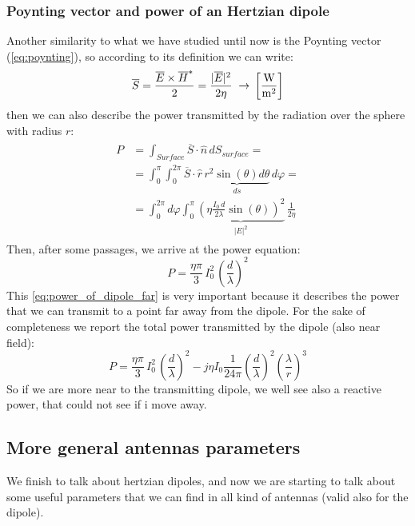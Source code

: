 \subsubsection*{Poynting vector and power of an Hertzian dipole}
Another similarity to what we have studied until now is the Poynting vector (\cref{eq:poynting}), so according to its definition we can write:
\begin{equation}
        \overline{S}=\frac{\overline{E}\times\overline{H}^*}{2}=\frac{|\overline{E}|^2}{2\eta}\;\rightarrow\,\left[\si{\frac{\watt}{\metre^2}}\right]
\end{equation}
then we can also describe the power transmitted by the radiation over the sphere with radius $r$:
\begin{align}
    \begin{split}
        P&=\int_{Surface}\overline{S}\cdot\hat{n}\, dS_{surface}=\\[5pt]
        &=\int_0^\pi\int_0^{2\pi}\overline{S}\cdot\hat{r}\,\underbrace{r^2\sin(\theta)d\theta}_{ds}\,d\varphi=\\[5pt]
        &=\int_0^{2\pi}d\varphi\int_0^\pi \underbrace{\left(\eta\frac{I_0\,d}{2\lambda}\sin(\theta)\right)^2}_{|E|^2}\,\frac{1}{2\eta}
    \end{split}
\end{align}
Then, after some passages, we arrive at the power equation:
\begin{equation}\label{eq:power_of_dipole_far}
    P=\frac{\eta \pi}{3}\,I_0^2\,\left(\frac{d}{\lambda}\right)^2
\end{equation}
This \cref{eq:power_of_dipole_far} is very important because it describes the power that we can transmit to a point far away from the dipole. For the sake of completeness we report the total power transmitted by the dipole (also near field):
\begin{equation}
    P=\frac{\eta \pi}{3}\,I_0^2\,\left(\frac{d}{\lambda}\right)^2-j\eta I_0\frac{1}{24\pi}\left(\frac{d}{\lambda}\right)^2\left(\frac{\lambda}{r}\right)^3
\end{equation}
So if we are more near to the transmitting dipole, we well see also a reactive power, that could not see if i move away.
\subsection*{More general antennas parameters}
We finish to talk about hertzian dipoles, and now we are starting to talk about some useful parameters that we can find in all kind of antennas (valid also for the dipole).
